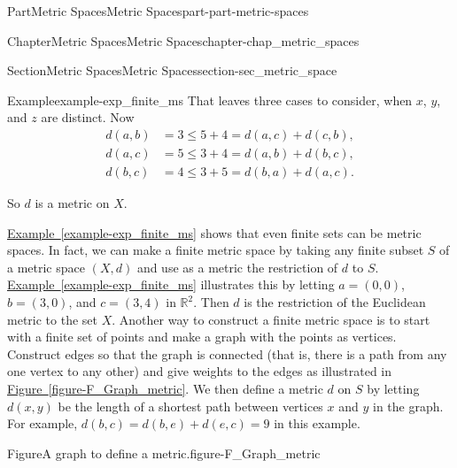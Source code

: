 \documentclass[oneside,10pt,]{book}
\newcommand{\xreffont}{\relax}
\numberwithin{equation}{chapter}
\newcommand{\R}{\mathbb{R}}
\newcommand{\amp}{&}
\begin{document}
\begin{partptx}{Part}{Metric Spaces}{}{Metric Spaces}{}{}{part-part-metric-spaces}
\begin{chapterptx}{Chapter}{Metric Spaces}{}{Metric Spaces}{}{}{chapter-chap_metric_spaces}
\begin{sectionptx}{Section}{Metric Spaces}{}{Metric Spaces}{}{}{section-sec_metric_space}
\begin{example}{Example}{}{example-exp_finite_ms}
That leaves three cases to consider, when \(x\), \(y\), and \(z\) are distinct. Now%
\begin{align*}
d(a,b) \amp = 3 \leq 5+4 = d(a,c) + d(c,b),\\
d(a,c) \amp = 5 \leq 3+4 = d(a,b) + d(b,c),\\
d(b,c) \amp = 4 \leq 3+5 = d(b,a) + d(a,c)\text{.}
\end{align*}
%
\par
So \(d\) is a metric on \(X\).%
\end{example}
\hyperref[example-exp_finite_ms]{Example~{\xreffont\ref{example-exp_finite_ms}}} shows that even finite sets can be metric spaces. In fact, we can make a finite metric space by taking any finite subset \(S\) of a metric space \((X,d)\) and use as a metric the restriction of \(d\) to \(S\). \hyperref[example-exp_finite_ms]{Example~{\xreffont\ref{example-exp_finite_ms}}} illustrates this by letting \(a = (0,0)\), \(b = (3,0)\), and \(c = (3,4)\) in \(\R^2\). Then \(d\) is the restriction of the Euclidean metric to the set \(X\). Another way to construct a finite metric space is to start with a finite set of points and make a graph with the points as vertices. Construct edges so that the graph is connected (that is, there is a path from any one vertex to any other) and give weights to the edges as illustrated in \hyperref[figure-F_Graph_metric]{Figure~{\xreffont\ref{figure-F_Graph_metric}}}. We then define a metric \(d\) on \(S\) by letting \(d(x,y)\) be the length of a shortest path between vertices \(x\) and \(y\) in the graph. For example, \(d(b,c) = d(b,e) + d(e,c) = 9\) in this example.%
\begin{figureptx}{Figure}{A graph to define a metric.}{figure-F_Graph_metric}{}%
\begin{image}{0.35}{0.3}{0.35}{}%

\end{image}
\end{figureptx}
\end{sectionptx}
\end{chapterptx}
\end{partptx}
\end{document}
